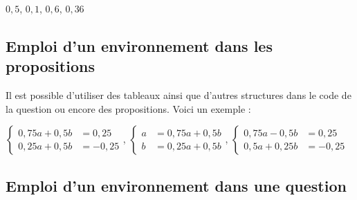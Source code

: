 \begin{tkzltxexample}[small]
 \begin{alterqcm}[lq=120mm,pre=true,pq=3mm]
 {{$0,5$},%
 {$0,1$},%
 {$0,6$},%
 {$0,36$}}
 \end{alterqcm} 
\end{tkzltxexample}

\subsection{Emploi d'un environnement  dans les propositions} 

Il est possible d'utiliser des tableaux ainsi que d'autres structures dans le code de la question ou encore des propositions. Voici un exemple :

\medskip


\begin{tkzexample}[vbox]
\begin{alterqcm}[lq=88mm,symb=$\Box$]
{%
{$ \left\lbrace
\begin{array}{ll}
 0,75a + 0,5b &= 0,25 \\
 0,25a + 0,5b &=-0,25
\end{array}\right.$},
{$ \left\{
\begin{array}{ll}
 a &=  0,75a +0,5b \\
 b &=  0,25a +0,5b
\end{array}\right.$},
{$ \left\lbrace
\begin{array}{ll}
 0,75a - 0,5b &= 0,25 \\
 0,5a + 0,25b &=-0,25
\end{array}\right.$}
}
\end{alterqcm}\end{tkzexample}  

\subsection{Emploi d'un environnement  dans une question} 

